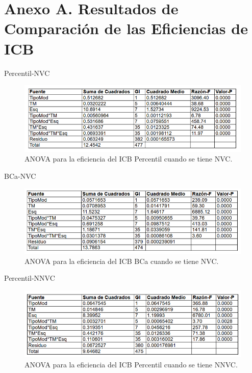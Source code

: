 \section*{Anexo A. Resultados de Comparación de las Eficiencias de ICB}


Percentil-NVC

\begin{figure}[ht] 
	\centering 
	\includegraphics[width=0.95\linewidth]{img/ANOVA_Efic_ICB_Perc_NVC.png} 
	\caption{ANOVA para la eficiencia del ICB Percentil cuando se tiene NVC.} 
	\label{fig:ANOVA_Efic_ICB_Perc_NVC}
\end{figure}
\FloatBarrier



BCa-NVC

\begin{figure}[ht] 
	\centering 
	\includegraphics[width=0.95\linewidth]{img/ANOVA_Efic_ICB_BCa_NVC.png} 
	\caption{ANOVA para la eficiencia del ICB BCa cuando se tiene NVC.} 
	\label{fig:ANOVA_Efic_ICB_BCa_NVC}
\end{figure}
\FloatBarrier




Percentil-NNVC

\begin{figure}[ht] 
	\centering 
	\includegraphics[width=0.95\linewidth]{img/ANOVA_Efic_ICB_Perc_NNVC.png} 
	\caption{ANOVA para la eficiencia del ICB Percentil cuando se tiene NNVC.} 
	\label{fig:ANOVA_Efic_ICB_Perc_NNVC}
\end{figure}
\FloatBarrier




